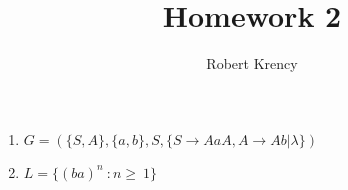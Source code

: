 \documentclass{article}
\date{}
\author{Robert Krency}
\title{Homework 2}
\begin{document}
\maketitle
\thispagestyle{fancy}

\begin{enumerate}

    \item $G = ( \{ S, A \} , \{a, b\} , S, \{ S \rightarrow AaA, A \rightarrow Ab | \lambda \} ) $

    \item $L = \{ (ba)^n\ : n \geq\ 1 \}$

\end{enumerate}
\end{document}
